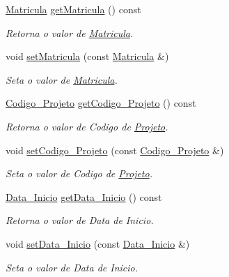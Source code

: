 \begin{DoxyCompactItemize}
\item 
\hyperlink{class_matricula}{\-Matricula} \hyperlink{class_projeto_ab5086bc8a75d77f2065639a836db28c9}{get\-Matricula} () const 
\begin{DoxyCompactList}\small\item\em \-Retorna o valor de \hyperlink{class_matricula}{\-Matricula}. \end{DoxyCompactList}\item 
void \hyperlink{class_projeto_a2f220b68285d6acefe2b406520326969}{set\-Matricula} (const \hyperlink{class_matricula}{\-Matricula} \&)
\begin{DoxyCompactList}\small\item\em \-Seta o valor de \hyperlink{class_matricula}{\-Matricula}. \end{DoxyCompactList}\item 
\hyperlink{class_codigo___projeto}{\-Codigo\-\_\-\-Projeto} \hyperlink{class_projeto_a1db1b38d1321c48894e74b7ac679b6e8}{get\-Codigo\-\_\-\-Projeto} () const 
\begin{DoxyCompactList}\small\item\em \-Retorna o valor de \-Codigo de \hyperlink{class_projeto}{\-Projeto}. \end{DoxyCompactList}\item 
void \hyperlink{class_projeto_aba31c1e58bebad9aa88e4dfc41897bd5}{set\-Codigo\-\_\-\-Projeto} (const \hyperlink{class_codigo___projeto}{\-Codigo\-\_\-\-Projeto} \&)
\begin{DoxyCompactList}\small\item\em \-Seta o valor de \-Codigo de \hyperlink{class_projeto}{\-Projeto}. \end{DoxyCompactList}\item 
\hyperlink{class_data___inicio}{\-Data\-\_\-\-Inicio} \hyperlink{class_projeto_a309461d7f136b25d6624b054c7beb3f0}{get\-Data\-\_\-\-Inicio} () const 
\begin{DoxyCompactList}\small\item\em \-Retorna o valor de \-Data de \-Inicio. \end{DoxyCompactList}\item 
void \hyperlink{class_projeto_a699ba726969093cf54a3b1a7677c4434}{set\-Data\-\_\-\-Inicio} (const \hyperlink{class_data___inicio}{\-Data\-\_\-\-Inicio} \&)
\begin{DoxyCompactList}\small\item\em \-Seta o valor de \-Data de \-Inicio. \end{DoxyCompactList}\item 

\end{DoxyCompactItemize}
